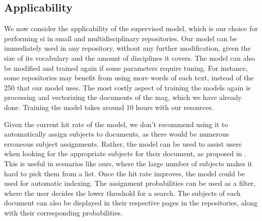 \subsection{Applicability}

We now consider the applicability of the supervised model, which is our choice for performing \acrshort{si} in small and multidisciplinary repositories. Our model can be immediately used in any repository, without any further modification, given the size of its vocabulary and the amount of disciplines it covers. The model can also be modified and trained again if some parameters require tuning. For instance, some repositories may benefit from using more words of each text, instead of the 250 that our model uses. The most costly aspect of training the models again is processing and vectorizing the documents of the \acrshort{mag}, which we have already done. Training the model takes around 10 hours with our resources.

Given the current hit rate of the model, we don't recommend using it to automatically assign subjects to documents, as there would be numerous erroneous subject assignments. Rather, the model can be used to assist users when looking for the appropriate subjects for their document, as proposed in \cite{heryawan2021medical}. This is useful in scenarios like ours, where the large number of subjects makes it hard to pick them from a list. Once the hit rate improves, the model could be used for automatic indexing. The assignment probabilities can be used as a filter, where the user decides the lower threshold for a search. The subjects of each document can also be displayed in their respective pages in the repositories, along with their corresponding probabilities.